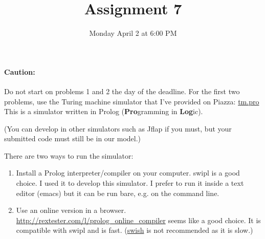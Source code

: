 \documentclass{cs81-homework}
\title{Assignment 7}
\date{Monday April 2 at 6:00 PM}
\author{}
\begin{document}
\begin{introduction}
  \theintroduction

  \paragraph{Caution:}
  Do not start on problems 1 and 2 the day of the deadline.  For the first two
  problems, use the Turing machine simulator that I’ve provided on Piazza:
  \href{https://docs.google.com/document/d/1DTeea4vqzkiHAo1imlpkXfG87q42BOmHq-jj4yDWGB0/edit}{tm.pro}
  This is a simulator written in Prolog (\textbf{Pro}gramming in
  \textbf{Log}ic).

  (You can develop in other simulators such as Jflap if you must, but your
  submitted code must still be in our model.)

  There are two ways to run the simulator:
  \begin{enumerate}
  \item Install a Prolog interpreter/compiler on your computer. swipl is a good
    choice. I used it to develop this simulator. I prefer to run it inside a
    text editor (emacs) but it can be run bare, e.g. on the command line.
  \item Use an online version in a browser.
    \url{http://rextester.com/l/prolog_online_compiler} seems like a good
    choice. It is compatible with swipl and is fast.
    (\href{https://swish.swi-prolog.org/p/vWMPonBw.pl}{swish} is not recommended
    as it is slow.)
  \end{enumerate}

\end{introduction}
\end{document}
